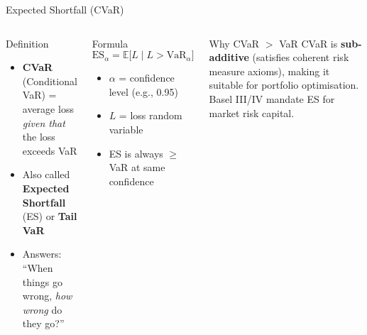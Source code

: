 \documentclass[8pt,aspectratio=169]{beamer}
\begin{document}
\begin{frame}{Expected Shortfall (CVaR)}
\begin{columns}[T]
\begin{block}{Definition}
\begin{itemize}\setlength{\itemsep}{2pt}
  \item \textbf{CVaR} (Conditional VaR) = average loss \emph{given that} the loss exceeds VaR
  \item Also called \textbf{Expected Shortfall} (ES) or \textbf{Tail VaR}
  \item Answers: ``When things go wrong, \emph{how wrong} do they go?''
\end{itemize}
\end{block}
\vspace{2mm}
\begin{block}{Formula}
$$\text{ES}_\alpha = \mathbb{E}\bigl[L \;\big|\; L > \text{VaR}_\alpha\bigr]$$
\begin{itemize}\setlength{\itemsep}{2pt}
  \item $\alpha$ = confidence level (e.g., 0.95)
  \item $L$ = loss random variable
  \item ES is always $\geq$ VaR at same confidence
\end{itemize}
\end{block}
\vspace{2mm}
\begin{alertblock}{Why CVaR $>$ VaR}
\scriptsize CVaR is \textbf{sub-additive} (satisfies coherent risk measure axioms), making it suitable for portfolio optimisation. Basel III/IV mandate ES for market risk capital.
\end{alertblock}
\end{columns}
\end{frame}
\end{document}
